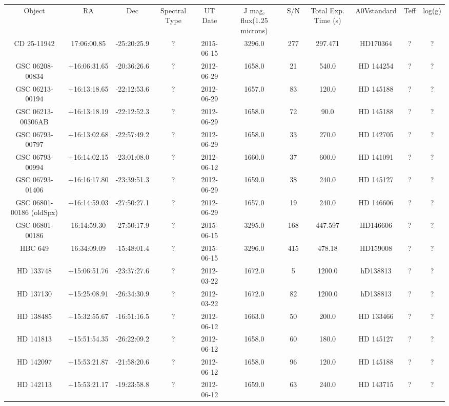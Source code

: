 \begin{table}
\begin{tabular}{ccccccccccc}
Object & RA & Dec & Spectral Type & UT Date & J mag, flux(1.25 microns) & S/N & Total Exp. Time (s) & A0Vstandard & Teff & log(g) \\
CD 25-11942 & 17:06:00.85 & -25:20:25.9 & ? & 2015-06-15 & 3296.0 & 277 & 297.471 & HD170364 & ? & ? \\
GSC 06208-00834 & +16:06:31.65 & -20:36:26.6 & ? & 2012-06-29 & 1658.0 & 21 & 540.0 & HD 144254 & ? & ? \\
GSC 06213-00194 & +16:13:18.65 & -22:12:53.6 & ? & 2012-06-29 & 1657.0 & 83 & 120.0 & HD 145188 & ? & ? \\
GSC 06213-00306AB & +16:13:18.19 & -22:12:52.3 & ? & 2012-06-29 & 1658.0 & 72 & 90.0 & HD 145188 & ? & ? \\
GSC 06793-00797 & +16:13:02.68 & -22:57:49.2 & ? & 2012-06-29 & 1658.0 & 33 & 270.0 & HD 142705 & ? & ? \\
GSC 06793-00994 & +16:14:02.15 & -23:01:08.0 & ? & 2012-06-12 & 1660.0 & 37 & 600.0 & HD 141091 & ? & ? \\
GSC 06793-01406 & +16:16:17.80 & -23:39:51.3 & ? & 2012-06-29 & 1659.0 & 38 & 240.0 & HD 145127 & ? & ? \\
GSC 06801-00186 (oldSpx) & +16:14:59.03 & -27:50:27.1 & ? & 2012-06-29 & 1657.0 & 19 & 240.0 & HD 146606 & ? & ? \\
GSC 06801-00186 & 16:14:59.30 & -27:50:17.9 & ? & 2015-06-15 & 3295.0 & 168 & 447.597 & HD146606 & ? & ? \\
HBC 649 & 16:34:09.09 & -15:48:01.4 & ? & 2015-06-15 & 3296.0 & 415 & 478.18 & HD159008 & ? & ? \\
HD 133748 & +15:06:51.76 & -23:37:27.6 & ? & 2012-03-22 & 1672.0 & 5 & 1200.0 & hD138813 & ? & ? \\
HD 137130 & +15:25:08.91 & -26:34:30.9 & ? & 2012-03-22 & 1672.0 & 82 & 1200.0 & hD138813 & ? & ? \\
HD 138485 & +15:32:55.67 & -16:51:16.5 & ? & 2012-06-12 & 1663.0 & 50 & 200.0 & HD 133466 & ? & ? \\
HD 141813 & +15:51:54.35 & -26:22:09.2 & ? & 2012-06-12 & 1658.0 & 60 & 180.0 & HD 145127 & ? & ? \\
HD 142097 & +15:53:21.87 & -21:58:20.6 & ? & 2012-06-12 & 1658.0 & 96 & 120.0 & HD 145188 & ? & ? \\
HD 142113 & +15:53:21.17 & -19:23:58.8 & ? & 2012-06-12 & 1659.0 & 63 & 240.0 & HD 143715 & ? & ? \\

\end{tabular}
\end{table}
